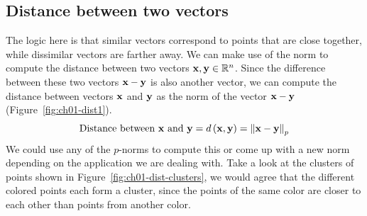\subsection{Distance between two vectors}
The logic here is that similar vectors correspond to points that are close together, while dissimilar vectors are farther away. We can make use of the norm to compute the distance between two vectors $\mathbf{x}, \mathbf{y} \in \mathbb{R}^n$. Since the difference between these two vectors $\mathbf{x} - \mathbf{y}$ is also another vector, we can compute the distance between vectors $\mathbf{x}$ and $\mathbf{y}$ as the norm of the vector $\mathbf{x} - \mathbf{y}$ (Figure~\ref{fig:ch01-dist1}).
\[ \text{Distance between } \mathbf{x} \text{ and } \mathbf{y} = d\left( \mathbf{x}, \mathbf{y}\right) = \left\lVert \mathbf{x} - \mathbf{y} \right\rVert_p \]
We could use any of the $p$-norms to compute this or come up with a new norm depending on the application we are dealing with. Take a look at the clusters of points shown in Figure~\ref{fig:ch01-dist-clusters}, we would agree that the different colored points each form a cluster, since the points of the same color are closer to each other than points from another color. 

